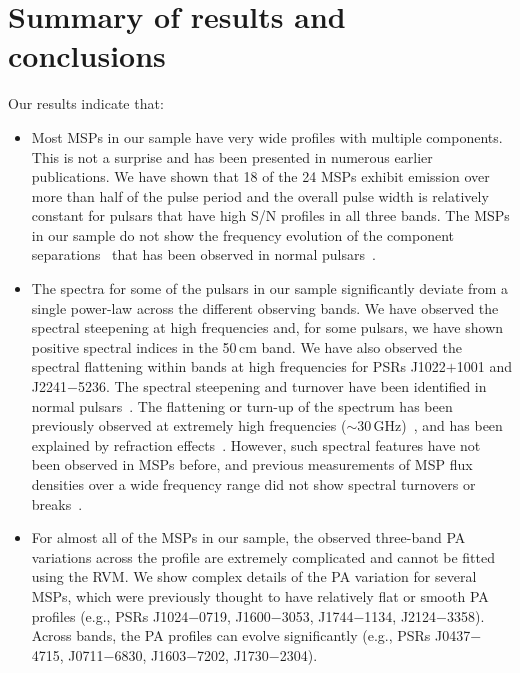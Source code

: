 \documentclass[useAMS,usenatbib]{mn2e}
\begin{document}
\section{Summary of results and conclusions}

Our results indicate that:
\begin{itemize}

\item Most MSPs in our sample have very wide profiles with multiple components. This is not a surprise and 
	has been presented in numerous earlier publications. We have shown that 18 of the 24 MSPs exhibit emission
  over more than half of the pulse period and the overall pulse width is relatively constant for
  pulsars that have high S/N profiles in all three bands. The MSPs in our sample do not show the frequency
  evolution of the component separations~\citep{Kramer99} that has been observed in normal pulsars~\citep[e.g.,][]{Cordes78,Thorsett91,Mitra02,Mitra04,Chen14}.
	
\item The spectra for some of the pulsars in our sample significantly deviate from a single power-law across 
	the different observing bands. We have observed the spectral steepening at high frequencies and, for 
	some pulsars, we have shown positive spectral indices in the 50\,cm band. We have also observed the spectral 
	flattening within bands at high frequencies for PSRs J1022$+$1001 and J2241$-$5236. The spectral  
	steepening and turnover have been identified in normal pulsars~\citep[e.g.,][]{Maron00,Kijak11}. The flattening 
	or turn-up of the spectrum has been previously observed at extremely high frequencies ($\sim30$\,GHz)~\citep{Kramer96}, 
	and has been explained by refraction effects~\citep{Petrova02}. 
	However, such spectral features have not been observed in MSPs before, and previous measurements of MSP flux 
	densities over a wide frequency range did not show spectral turnovers or breaks~\citep{Kramer99,Kuzmin01}. 

\item For almost all of the MSPs in our sample, the observed three-band PA variations across the profile 
	are extremely complicated and cannot be fitted using the RVM. We show complex details of 
	the PA variation for several MSPs, which were previously thought to have relatively flat or smooth PA 
	profiles (e.g., PSRs J1024$-$0719, J1600$-$3053, J1744$-$1134, J2124$-$3358). Across bands, the 
	PA profiles can evolve significantly (e.g., PSRs J0437$-$4715, J0711$-$6830, J1603$-$7202, J1730$-$2304).


\end{itemize}
\end{document}
